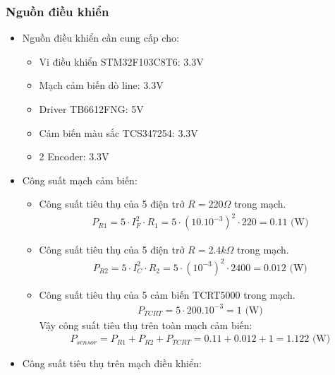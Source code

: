             \subsubsection{Nguồn điều khiển}
                \begin{itemize}
                    \item Nguồn điều khiển cần cung cấp cho:
                    \begin{itemize}
                        \item Vi điều khiển STM32F103C8T6: 3.3V
                        \item Mạch cảm biến dò line: 3.3V
                        \item Driver TB6612FNG: 5V
                        \item Cảm biến màu sắc TCS347254: 3.3V
                        \item 2 Encoder: 3.3V
                    \end{itemize}
                    \item Công suất mạch cảm biến:
                    \begin{itemize}
                        \item Công suất tiêu thụ của 5 điện trở $R = 220 \Omega$ trong mạch. \\
                        \begin{align*}
                            P_{R1} = 5 \cdot I_{F}^2 \cdot R_1 = 5 \cdot (10.10^{-3})^2 \cdot 220 = 0.11 \text{ (W)}
                        \end{align*}
                        \item Công suất tiêu thụ của 5 điện trở $R = 2.4 k\Omega$ trong mạch. \\
                        \begin{align*}
                            P_{R2} = 5 \cdot I_{C}^2 \cdot R_2 = 5 \cdot (10^{-3})^2 \cdot 2400 = 0.012  \text{ (W)}
                        \end{align*}
                        \item Công suất tiêu thụ của 5 cảm biến TCRT5000 trong mạch. \\
                        \begin{align*}
                            P_{TCRT} = 5 \cdot 200.10^{-3} = 1 \text{ (W)}
                        \end{align*}
                        Vậy công suất tiêu thụ trên toàn mạch cảm biến:
                        \begin{align*}
                            P_{sensor} = P_{R1} + P_{R2} + P_{TCRT} = 0.11 + 0.012 + 1 = 1.122 \text{ (W)}
                        \end{align*}
                    \end{itemize}
                    \item Công suất tiêu thụ trên mạch điều khiển:
                    \begin{itemize}
                        
                    \end{itemize}
                \end{itemize}